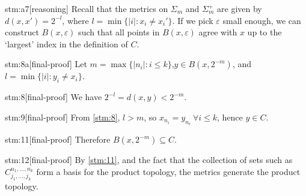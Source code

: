 \documentclass{article}
\begin{document}
\begin{stm}{stm:a7}[reasoning]
Recall that the metrics on $\Sigma_m$ and $\Sigma_m^+$ are given by $d(x,x') = 2^{-l}$, where $l = \min \{ |i| : x_i \ne x_i' \}$. If we pick $\varepsilon$ small enough, we can construct $B(x, \varepsilon)$ such that all points in $B(x, \varepsilon)$ agree with $x$ up to the ‘largest’ index in the definition of $C$.
\end{stm}

\begin{stm}{stm:8a}[final-proof]
Let $m = \max \{ |n_i| : i \leq k \}$,$y \in B(x, 2^{-m})$, and $l = \min \{ |i| : y_i \ne x_i \}$. 
\end{stm}

\begin{stm}{stm:8}[final-proof]
We have $2^{-l} = d(x,y) < 2^{-m}$.
\end{stm}

\begin{stm}{stm:9}[final-proof]
From \ref{stm:8}, $l > m$, so $x_{n_i} = y_{n_i} \ \forall i \leq k$, hence $y \in C$.
\end{stm}

\begin{stm}{stm:11}[final-proof]
Therefore $B(x, 2^{-m}) \subseteq C$.
\end{stm}

\begin{stm}{stm:12}[final-proof]
By \ref{stm:11}, and the fact that the collection of sets such as $C_{j_1,\ldots,j_k}^{n_1,\ldots,n_k}$ form a basis for the product topology, the metrics generate the product topology.
\end{stm}
\end{document}
